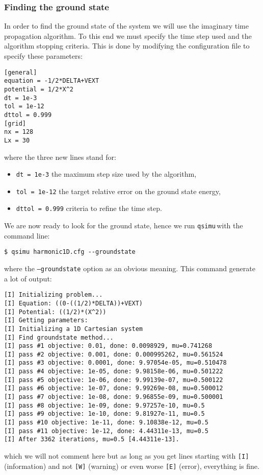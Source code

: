 \documentclass[12pt,a4paper]{report}
\newcommand{\qsimu}{\texttt{qsimu}\,}
\begin{document}
\subsubsection{Finding the ground state}
In order to find the ground state of the system we will use the imaginary time propagation algorithm.
To this end we must specify the time step used and the algorithm stopping criteria.
This is done by modifying the configuration file to specify these parameters:
\begin{verbatim}
[general]
equation = -1/2*DELTA+VEXT
potential = 1/2*X^2
dt = 1e-3
tol = 1e-12
dttol = 0.999
[grid]
nx = 128
Lx = 30
\end{verbatim}
where the three new lines stand for:
\begin{itemize}
\item\texttt{dt = 1e-3} the maximum step size used by the algorithm,
\item\texttt{tol = 1e-12} the target relative error on the ground state energy,
\item\texttt{dttol = 0.999} criteria to refine the time step.
\end{itemize}

We are now ready to look for the ground state, hence we run \qsimu with the command line:
\begin{verbatim}
$ qsimu harmonic1D.cfg --groundstate
\end{verbatim}
where the \texttt{--groundstate} option as an obvious meaning.
This command generate a lot of output:
\begin{verbatim}
[I] Initializing problem...
[I] Equation: ((0-((1/2)*DELTA))+VEXT)
[I] Potential: ((1/2)*(X^2))
[I] Getting parameters:
[I] Initializing a 1D Cartesian system
[I] Find groundstate method...
[I]	pass #1 objective: 0.01, done: 0.0098929, mu=0.741268
[I]	pass #2 objective: 0.001, done: 0.000995262, mu=0.561524
[I]	pass #3 objective: 0.0001, done: 9.97054e-05, mu=0.510478
[I]	pass #4 objective: 1e-05, done: 9.98158e-06, mu=0.501222
[I]	pass #5 objective: 1e-06, done: 9.99139e-07, mu=0.500122
[I]	pass #6 objective: 1e-07, done: 9.99269e-08, mu=0.500012
[I]	pass #7 objective: 1e-08, done: 9.96855e-09, mu=0.500001
[I]	pass #8 objective: 1e-09, done: 9.97257e-10, mu=0.5
[I]	pass #9 objective: 1e-10, done: 9.81927e-11, mu=0.5
[I]	pass #10 objective: 1e-11, done: 9.10838e-12, mu=0.5
[I]	pass #11 objective: 1e-12, done: 4.44311e-13, mu=0.5
[I] After 3362 iterations, mu=0.5 [4.44311e-13].
\end{verbatim}
which we will not comment here but as long as you get lines starting with \texttt{[I]} (information) and not \texttt{[W]} (warning) or even worse \texttt{[E]} (error), everything is fine.
\end{document}
